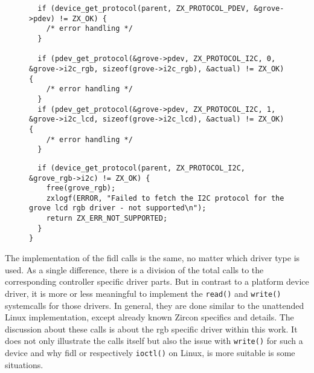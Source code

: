 \begin{figure}[!h]
 \begin{minipage}{0.45\textwidth}
  \centering
  \begin{verbatim}
  if (device_get_protocol(parent, ZX_PROTOCOL_PDEV, &grove->pdev) != ZX_OK) {
    /* error handling */
  }

  if (pdev_get_protocol(&grove->pdev, ZX_PROTOCOL_I2C, 0, &grove->i2c_rgb, sizeof(grove->i2c_rgb), &actual) != ZX_OK) {
    /* error handling */
  }
  if (pdev_get_protocol(&grove->pdev, ZX_PROTOCOL_I2C, 1, &grove->i2c_lcd, sizeof(grove->i2c_lcd), &actual) != ZX_OK) {
    /* error handling */
  }
  \end{verbatim}
  \label{lst:i2callocpdev}
 \end{minipage}
 \hspace{0.09\textwidth}
 \begin{minipage}{0.45\textwidth}
  \centering
  \begin{verbatim}
  if (device_get_protocol(parent, ZX_PROTOCOL_I2C, &grove_rgb->i2c) != ZX_OK) {
    free(grove_rgb);
    zxlogf(ERROR, "Failed to fetch the I2C protocol for the grove lcd rgb driver - not supported\n");
    return ZX_ERR_NOT_SUPPORTED;
  }
}
  \end{verbatim}
  \label{lst:i2calloccomm}
 \end{minipage}
  \label{lst:i2c:pdev:common:comp}
\end{figure}

The implementation of the \ac{fidl} calls is the same, no matter which driver type is used.
As a single difference, there is a division of the total calls to the corresponding controller specific driver parts.
But in contrast to a platform device driver, it is more or less meaningful to implement the \texttt{read()} and \texttt{write()} systemcalls for those drivers.
In general, they are done similar to the unattended Linux implementation, except already known Zircon specifics and details.
The discussion about these calls is about the \ac{rgb} specific driver within this work.
It does not only illustrate the calls itself but also the issue with \texttt{write()} for such a device and why \ac{fidl} or respectively \texttt{ioctl()} on Linux, is more suitable is some situations.

